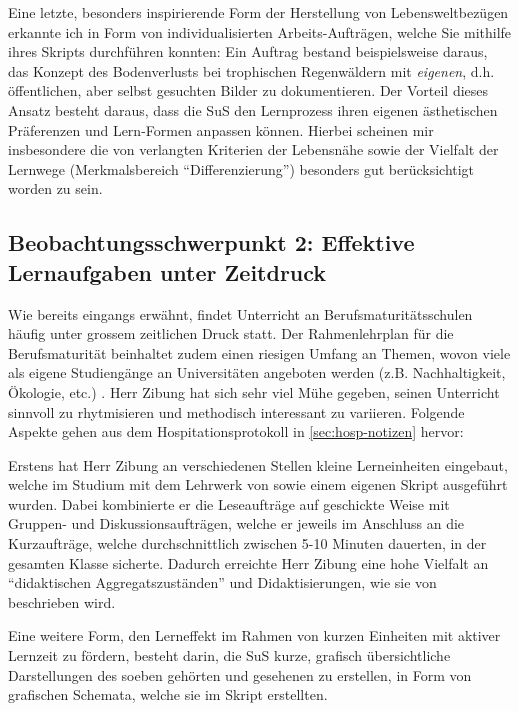 Eine letzte, besonders inspirierende Form der Herstellung von Lebensweltbezügen erkannte ich in Form von individualisierten Arbeits-Aufträgen, welche Sie mithilfe ihres Skripts durchführen konnten: Ein Auftrag bestand beispielsweise daraus, das Konzept des Bodenverlusts bei trophischen Regenwäldern mit \textit{eigenen}, d.h. öffentlichen, aber selbst gesuchten Bilder zu dokumentieren. Der Vorteil dieses Ansatz besteht daraus, dass die SuS den Lernprozess ihren eigenen ästhetischen Präferenzen und Lern-Formen anpassen können. Hierbei scheinen mir insbesondere die von \textcite{chem} verlangten Kriterien der Lebensnähe sowie der Vielfalt der Lernwege (Merkmalsbereich ``Differenzierung'') besonders gut berücksichtigt worden zu sein.


\subsection{Beobachtungsschwerpunkt 2: Effektive Lernaufgaben unter Zeitdruck}
Wie bereits eingangs erwähnt, findet Unterricht an Berufsmaturitätsschulen häufig unter grossem zeitlichen Druck statt. Der Rahmenlehrplan für die Berufsmaturität beinhaltet zudem einen riesigen Umfang an Themen, wovon viele als eigene Studiengänge an Universitäten angeboten werden (z.B. Nachhaltigkeit, Ökologie, etc.) \cite{sbfi}. Herr Zibung hat sich sehr viel Mühe gegeben, seinen Unterricht sinnvoll zu rhytmisieren und methodisch interessant zu variieren. Folgende Aspekte gehen aus dem Hospitationsprotokoll in \cref{sec:hosp-notizen} hervor:

Erstens hat Herr Zibung an verschiedenen Stellen kleine Lerneinheiten eingebaut, welche im Studium mit dem Lehrwerk von \textcite{compendio} sowie einem eigenen Skript ausgeführt wurden. Dabei kombinierte er die Leseaufträge auf geschickte Weise mit Gruppen- und Diskussionsaufträgen, welche er jeweils im Anschluss an die Kurzaufträge, welche durchschnittlich zwischen 5-10 Minuten dauerten, in der gesamten Klasse sicherte. Dadurch erreichte Herr Zibung eine hohe Vielfalt an ``didaktischen Aggregatszuständen'' und Didaktisierungen, wie sie von \textcite{kaiser} beschrieben wird.

Eine weitere Form, den Lerneffekt im Rahmen von kurzen Einheiten mit aktiver Lernzeit zu fördern, besteht darin, die SuS kurze, grafisch übersichtliche Darstellungen des soeben gehörten und gesehenen zu erstellen, in Form von grafischen Schemata, welche sie im Skript erstellten.

